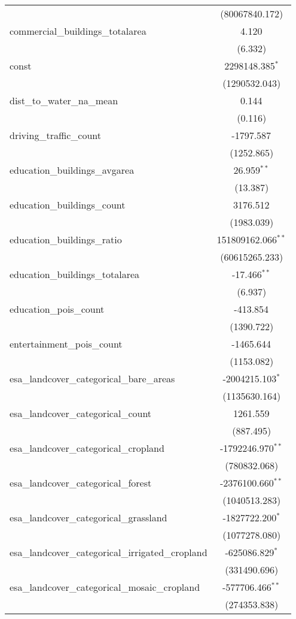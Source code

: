 \begin{table}[!htbp]
\begin{tabular}{@{\extracolsep{5pt}}lc}
  & (80067840.172) \\
 commercial_buildings_totalarea & 4.120$^{}$ \\
  & (6.332) \\
 const & 2298148.385$^{*}$ \\
  & (1290532.043) \\
 dist_to_water_na_mean & 0.144$^{}$ \\
  & (0.116) \\
 driving_traffic_count & -1797.587$^{}$ \\
  & (1252.865) \\
 education_buildings_avgarea & 26.959$^{**}$ \\
  & (13.387) \\
 education_buildings_count & 3176.512$^{}$ \\
  & (1983.039) \\
 education_buildings_ratio & 151809162.066$^{**}$ \\
  & (60615265.233) \\
 education_buildings_totalarea & -17.466$^{**}$ \\
  & (6.937) \\
 education_pois_count & -413.854$^{}$ \\
  & (1390.722) \\
 entertainment_pois_count & -1465.644$^{}$ \\
  & (1153.082) \\
 esa_landcover_categorical_bare_areas & -2004215.103$^{*}$ \\
  & (1135630.164) \\
 esa_landcover_categorical_count & 1261.559$^{}$ \\
  & (887.495) \\
 esa_landcover_categorical_cropland & -1792246.970$^{**}$ \\
  & (780832.068) \\
 esa_landcover_categorical_forest & -2376100.660$^{**}$ \\
  & (1040513.283) \\
 esa_landcover_categorical_grassland & -1827722.200$^{*}$ \\
  & (1077278.080) \\
 esa_landcover_categorical_irrigated_cropland & -625086.829$^{*}$ \\
  & (331490.696) \\
 esa_landcover_categorical_mosaic_cropland & -577706.466$^{**}$ \\
  & (274353.838) \\

\end{tabular}
\end{table}
